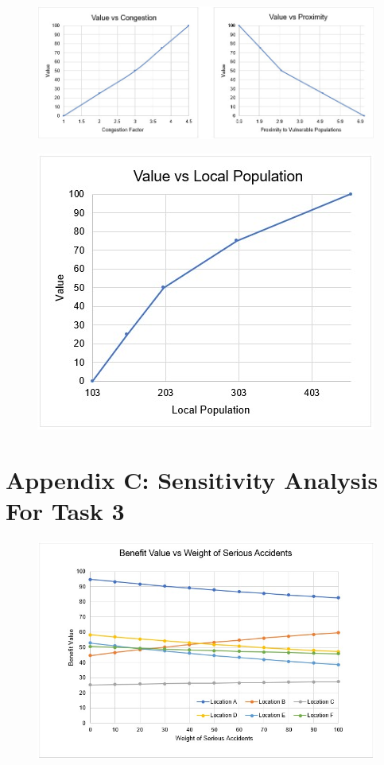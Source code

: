 \documentclass[11pt, a4paper]{article}
\begin{document}
        \begin{figure}[!ht]
            \centering
            \includegraphics[width=\textwidth]{appendices/2b.jpg}
        \end{figure}

        \begin{figure}[!ht]
            \centering
            \includegraphics[width=\textwidth]{appendices/2c.jpg}
        \end{figure}

    \newpage
    \section*{Appendix C: Sensitivity Analysis For Task 3}

        \begin{figure}[!ht]
            \centering
            \includegraphics[width=\textwidth]{appendices/3a.jpg}
        \end{figure}
\end{document}
